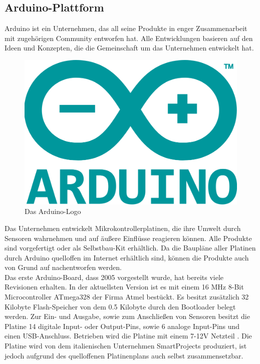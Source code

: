 \subsection{Arduino-Plattform}\label{ss:Arduino}

Arduino ist ein Unternehmen, das all seine Produkte in enger Zusammenarbeit mit zugehörigen Community entworfen hat. Alle Entwicklungen basieren auf den Ideen und Konzepten, die die Gemeinschaft um das Unternehmen entwickelt hat. 

\begin{figure}[H] 
	\centering
	\includegraphics[scale=0.2]{Bilder/arduino}
	\caption{Das Arduino-Logo\cite{i:arduino}}
	\label{f:arduino}
\end{figure}

Das Unternehmen entwickelt Mikrokontrollerplatinen, die ihre Umwelt durch Sensoren wahrnehmen und auf äußere Einflüsse reagieren können. Alle Produkte sind vorgefertigt oder als Selbstbau-Kit erhältlich. Da die Baupläne aller Platinen durch Arduino quelloffen im Internet erhältlich sind, können die Produkte auch von Grund auf nachentworfen werden.\\

Das erste Arduino-Board, dass 2005 vorgestellt wurde, hat bereits viele Revisionen erhalten. In der aktuellsten Version ist es mit einem 16 \ac{MHz} 8-Bit Microcontroller ATmega328 der Firma Atmel bestückt. Es besitzt zusätzlich 32 Kilobyte Flash-Speicher von dem 0.5 Kilobyte durch den Bootloader belegt werden. Zur Ein- und Ausgabe, sowie zum Anschließen von Sensoren besitzt die Platine 14 digitale Input- oder Output-Pins, sowie 6 analoge Input-Pins und einen \ac{USB}-Anschluss. Betrieben wird die Platine mit einem 7-12V Netzteil \cite{ws:arduinouno}.
Die Platine wird von dem italienischen Unternehmen SmartProjects produziert, ist jedoch aufgrund des quelloffenen Platinenplans auch selbst zusammensetzbar.\\

